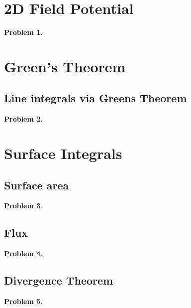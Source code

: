 \documentclass{article}
\newtheorem{problem}{Problem}
\begin{document}
\section{2D Field Potential}
\begin{problem}

\end{problem}
\section{Green's Theorem}
\subsection{Line integrals via Greens Theorem}
\begin{problem}

\end{problem}
\section{Surface Integrals}
\subsection{Surface area}
\begin{problem}

\end{problem}
\subsection{Flux}
\begin{problem}

\end{problem}
\subsection{Divergence Theorem }
\begin{problem}

\end{problem}
\end{document}
